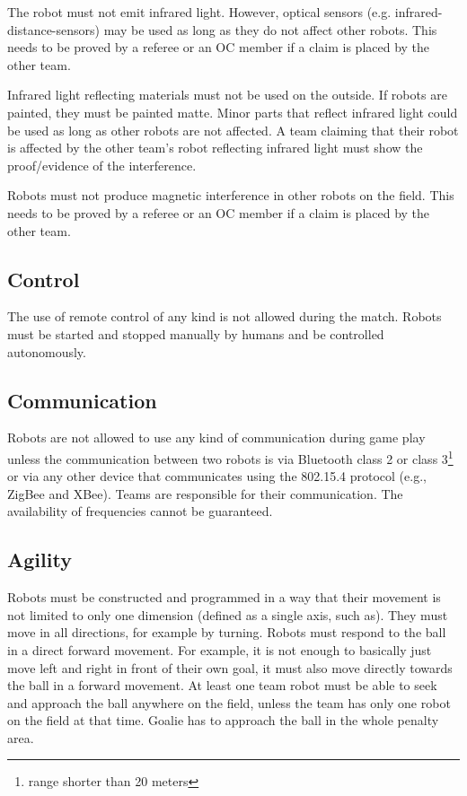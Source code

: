 \documentclass{article}
\begin{document}
The robot must not emit infrared light. However, optical sensors (e.g.
infrared-distance-sensors) may be used as long as they do not affect other
robots. This needs to be proved by a referee or an OC member if a claim is
placed by the other team.

Infrared light reflecting materials must not be used on the outside. If robots
are painted, they must be painted matte. Minor parts that reflect infrared
light could be used as long as other robots are not affected. A team claiming
that their robot is affected by the other team's robot reflecting infrared
light must show the proof/evidence of the interference.

Robots must not produce magnetic interference in other robots on the field.
This needs to be proved by a referee or an OC member if a claim is placed by
the other team.

\subsection{ Control \label{ref-control}}

The use of remote control of any kind is not allowed during the match. Robots
must be started and stopped manually by humans and be controlled autonomously.

\subsection{ Communication \label{ref-022}}

Robots are not allowed to use any kind of communication during game play unless
the communication between two robots is via Bluetooth class 2 or class
3\footnote{range shorter than 20 meters} or via any other device that
communicates using the 802.15.4 protocol (e.g., ZigBee and XBee). Teams are
responsible for their communication. The availability of frequencies cannot be
guaranteed.

\subsection{Agility \label{ref-agility}}

Robots must be constructed and programmed in a way that their movement is not
limited to only one dimension (defined as a single axis, such as). They must
move in all directions, for example by turning. Robots must respond to the ball
in a direct forward movement. For example, it is not enough to basically just
move left and right in front of their own goal, it must also move directly
towards the ball in a forward movement. At least one team robot must be able to
seek and approach the ball anywhere on the field, unless the team has only one
robot on the field at that time. Goalie has to approach the ball in the whole
penalty area.
\end{document}
